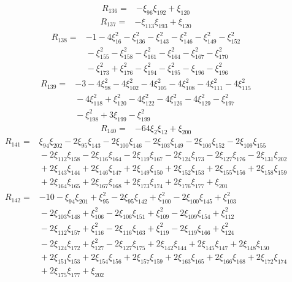 \[
\begin{aligned}
 R_{136}={}&-\xi_{96}\xi_{192}+\xi_{120}
\end{aligned}
\]
\[
\begin{aligned}
 R_{137}={}&-\xi_{113}\xi_{193}+\xi_{120}
\end{aligned}
\]
\[
\begin{aligned}
 R_{138}={}&-1-4\xi_{16}^{2}-\xi_{136}^{2}-\xi_{143}^{2}-\xi_{146}^{2}-\xi_{149}^{2}-\xi_{152}^{2}\\
 &{}-\xi_{155}^{2}-\xi_{158}^{2}-\xi_{161}^{2}-\xi_{164}^{2}-\xi_{167}^{2}-\xi_{170}^{2}\\
 &{}-\xi_{173}^{2}+\xi_{176}^{2}-\xi_{194}^{2}-\xi_{195}^{2}-\xi_{196}-\xi_{196}^{2}
\end{aligned}
\]
\[
\begin{aligned}
 R_{139}={}&-3-4\xi_{98}^{2}-4\xi_{102}^{2}-4\xi_{105}^{2}-4\xi_{108}^{2}-4\xi_{111}^{2}-4\xi_{115}^{2}\\
 &{}-4\xi_{118}^{2}+\xi_{120}^{2}-4\xi_{122}^{2}-4\xi_{126}^{2}-4\xi_{129}^{2}-\xi_{197}^{2}\\
 &{}-\xi_{198}^{2}+3\xi_{199}-\xi_{199}^{2}
\end{aligned}
\]
\[
\begin{aligned}
 R_{140}={}&-64\xi_{2}\xi_{12}+\xi_{200}
\end{aligned}
\]
\[
\begin{aligned}
 R_{141}={}&\xi_{94}\xi_{202}-2\xi_{95}\xi_{143}-2\xi_{100}\xi_{146}-2\xi_{103}\xi_{149}-2\xi_{106}\xi_{152}-2\xi_{109}\xi_{155}\\
 &{}-2\xi_{112}\xi_{158}-2\xi_{116}\xi_{164}-2\xi_{119}\xi_{167}-2\xi_{124}\xi_{173}-2\xi_{127}\xi_{176}-2\xi_{131}\xi_{202}\\
 &{}+2\xi_{143}\xi_{144}+2\xi_{146}\xi_{147}+2\xi_{149}\xi_{150}+2\xi_{152}\xi_{153}+2\xi_{155}\xi_{156}+2\xi_{158}\xi_{159}\\
 &{}+2\xi_{164}\xi_{165}+2\xi_{167}\xi_{168}+2\xi_{173}\xi_{174}+2\xi_{176}\xi_{177}+\xi_{201}
\end{aligned}
\]
\[
\begin{aligned}
 R_{142}={}&-10-\xi_{94}\xi_{201}+\xi_{95}^{2}-2\xi_{95}\xi_{142}+\xi_{100}^{2}-2\xi_{100}\xi_{145}+\xi_{103}^{2}\\
 &{}-2\xi_{103}\xi_{148}+\xi_{106}^{2}-2\xi_{106}\xi_{151}+\xi_{109}^{2}-2\xi_{109}\xi_{154}+\xi_{112}^{2}\\
 &{}-2\xi_{112}\xi_{157}+\xi_{116}^{2}-2\xi_{116}\xi_{163}+\xi_{119}^{2}-2\xi_{119}\xi_{166}+\xi_{124}^{2}\\
 &{}-2\xi_{124}\xi_{172}+\xi_{127}^{2}-2\xi_{127}\xi_{175}+2\xi_{142}\xi_{144}+2\xi_{145}\xi_{147}+2\xi_{148}\xi_{150}\\
 &{}+2\xi_{151}\xi_{153}+2\xi_{154}\xi_{156}+2\xi_{157}\xi_{159}+2\xi_{163}\xi_{165}+2\xi_{166}\xi_{168}+2\xi_{172}\xi_{174}\\
 &{}+2\xi_{175}\xi_{177}+\xi_{202}
\end{aligned}
\]
